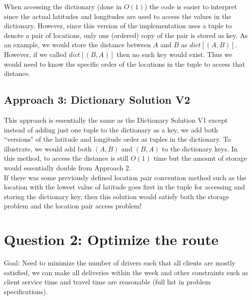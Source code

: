 \documentclass{article}
\begin{document}
When accessing the dictionary (done in $O(1)$) the code is easier to interpret since the actual latitudes and longitudes are used to access the values in the dictionary.  However, since this version of the implementation uses a tuple to denote a pair of locations, only one (ordered) copy of the pair is stored as key.  As an example, we would store the distance between $A$ and $B$ as $dict[(A,B)]$.  However, if we called $dict[(B,A)]$ then no such key would exist.  Thus we would need to know the specific order of the locations in the tuple to access that distance. 

\subsection{Approach 3: Dictionary Solution V2}
This approach is essentially the same as the Dictionary Solution V1 except instead of adding just one tuple to the dictionary as a key, we add both ``versions" of the latitude and longitude order as tuples in the dictionary.  To illustrate, we would add both $(A,B)$ and $(B,A)$ to the dictionary keys.  In this method, to access the distance is still $O(1)$ time but the amount of storage would essentially double from Approach 2.\\

If there was some previously defined location pair convention method such as the location with the lowest value of latitude goes first in the tuple for accessing and storing the dictionary key, then this solution would satisfy both the storage problem and the location pair access problem!

\section{Question 2: Optimize the route}
Goal: Need to minimize the number of drivers such that all clients are
mostly satisfied, we can make all deliveries within the week and other constraints
such as client service time and travel time are reasonable (full list in problem specifications).
\end{document}
